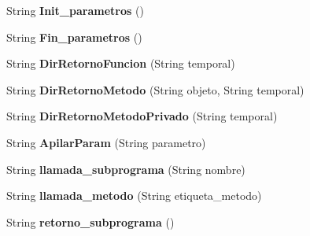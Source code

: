 \begin{DoxyCompactItemize}
\item 
\hypertarget{classcompilationunit_1_1_tercetos_a5ca68fa3dcd5f0ef95807f1568f82d14}{
String {\bfseries Init\_\-parametros} ()}
\label{classcompilationunit_1_1_tercetos_a5ca68fa3dcd5f0ef95807f1568f82d14}

\item 
\hypertarget{classcompilationunit_1_1_tercetos_a1fefb0b217751cdd983637df04a762be}{
String {\bfseries Fin\_\-parametros} ()}
\label{classcompilationunit_1_1_tercetos_a1fefb0b217751cdd983637df04a762be}

\item 
\hypertarget{classcompilationunit_1_1_tercetos_ac76c58fd1179db3c8a1f2dfbfb09086b}{
String {\bfseries DirRetornoFuncion} (String temporal)}
\label{classcompilationunit_1_1_tercetos_ac76c58fd1179db3c8a1f2dfbfb09086b}

\item 
\hypertarget{classcompilationunit_1_1_tercetos_a60b873882aa81dd543e44fdb0a2e4e2d}{
String {\bfseries DirRetornoMetodo} (String objeto, String temporal)}
\label{classcompilationunit_1_1_tercetos_a60b873882aa81dd543e44fdb0a2e4e2d}

\item 
\hypertarget{classcompilationunit_1_1_tercetos_a2bab749700e8de1013dcf8b12bc9cf52}{
String {\bfseries DirRetornoMetodoPrivado} (String temporal)}
\label{classcompilationunit_1_1_tercetos_a2bab749700e8de1013dcf8b12bc9cf52}

\item 
\hypertarget{classcompilationunit_1_1_tercetos_ab4ecd9008654bfd5a8c1e1427a80b9b4}{
String {\bfseries ApilarParam} (String parametro)}
\label{classcompilationunit_1_1_tercetos_ab4ecd9008654bfd5a8c1e1427a80b9b4}

\item 
\hypertarget{classcompilationunit_1_1_tercetos_a1e04b7f21ac9f1011655e0ae3040a6e2}{
String {\bfseries llamada\_\-subprograma} (String nombre)}
\label{classcompilationunit_1_1_tercetos_a1e04b7f21ac9f1011655e0ae3040a6e2}

\item 
\hypertarget{classcompilationunit_1_1_tercetos_a3aef090b426c4cf934948cc90cb85770}{
String {\bfseries llamada\_\-metodo} (String etiqueta\_\-metodo)}
\label{classcompilationunit_1_1_tercetos_a3aef090b426c4cf934948cc90cb85770}

\item 
\hypertarget{classcompilationunit_1_1_tercetos_a83729a3805cb14ec9053f5ad85721887}{
String {\bfseries retorno\_\-subprograma} ()}
\label{classcompilationunit_1_1_tercetos_a83729a3805cb14ec9053f5ad85721887}


\end{DoxyCompactItemize}
